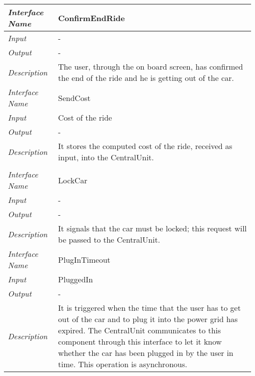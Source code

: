 \begin{longtable}{|>{\em}l|X|}
	\hline
	\hline
	Interface Name& ConfirmEndRide\\
	\hline
	Input & -\\
	\hline
	Output & -\\
	\hline
	Description &The user, through the on board screen, has confirmed the end of the ride and he is getting out of the car.\\
	\hline
	\hline
	Interface Name& SendCost\\
	\hline
	Input & Cost of the ride\\
	\hline
	Output & -\\
	\hline
	Description &It stores the computed cost of the ride, received as input, into the CentralUnit.\\\\
	\hline
	Interface Name& LockCar\\
	\hline
	Input &-\\
	\hline
	Output & -\\
	\hline
	Description &It signals that the car must be locked; this request will be passed to the CentralUnit.\\
	\hline
	\hline
	Interface Name& PlugInTimeout\\
	\hline
	Input & PluggedIn\\
	\hline
	Output & -\\
	\hline
	Description &It is triggered when the time that the user has to get out of the car and to plug it into the power grid has expired. The CentralUnit communicates to this component through this interface to let it know whether the car has been plugged in by the user in time. This operation is asynchronous.\\
	\hline
\end{longtable}